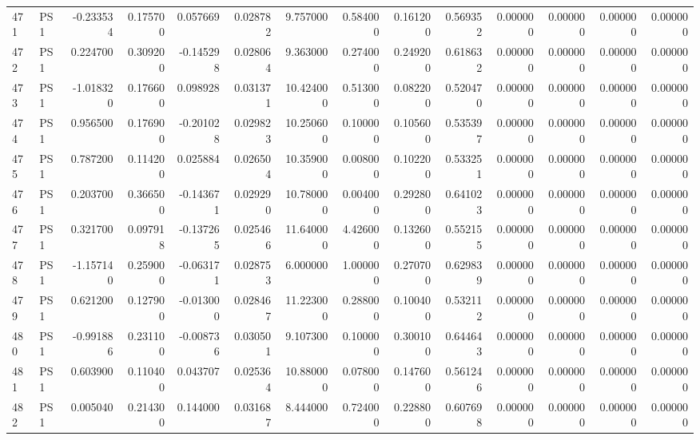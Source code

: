 \begin{tabular}{llrrrrrrrrrrrr}
471 &    PS1 & -0.233534 &      0.175700 &  0.057669 &    0.028782 &   9.757000 &      0.584000 &   0.161200 &  0.569352 &  0.000000 &   0.000000 &     0.000000 &     0.000000 \\
472 &    PS1 &  0.224700 &      0.309200 & -0.145298 &    0.028064 &   9.363000 &      0.274000 &   0.249200 &  0.618632 &  0.000000 &   0.000000 &     0.000000 &     0.000000 \\
473 &    PS1 & -1.018320 &      0.176600 &  0.098928 &    0.031371 &  10.424000 &      0.513000 &   0.082200 &  0.520470 &  0.000000 &   0.000000 &     0.000000 &     0.000000 \\
474 &    PS1 &  0.956500 &      0.176900 & -0.201028 &    0.029823 &  10.250600 &      0.100000 &   0.105600 &  0.535397 &  0.000000 &   0.000000 &     0.000000 &     0.000000 \\
475 &    PS1 &  0.787200 &      0.114200 &  0.025884 &    0.026504 &  10.359000 &      0.008000 &   0.102200 &  0.533251 &  0.000000 &   0.000000 &     0.000000 &     0.000000 \\
476 &    PS1 &  0.203700 &      0.366500 & -0.143671 &    0.029290 &  10.780000 &      0.004000 &   0.292800 &  0.641023 &  0.000000 &   0.000000 &     0.000000 &     0.000000 \\
477 &    PS1 &  0.321700 &      0.097918 & -0.137265 &    0.025466 &  11.640000 &      4.426000 &   0.132600 &  0.552155 &  0.000000 &   0.000000 &     0.000000 &     0.000000 \\
478 &    PS1 & -1.157140 &      0.259000 & -0.063171 &    0.028753 &   6.000000 &      1.000000 &   0.270700 &  0.629839 &  0.000000 &   0.000000 &     0.000000 &     0.000000 \\
479 &    PS1 &  0.621200 &      0.127900 & -0.013000 &    0.028467 &  11.223000 &      0.288000 &   0.100400 &  0.532112 &  0.000000 &   0.000000 &     0.000000 &     0.000000 \\
480 &    PS1 & -0.991886 &      0.231100 & -0.008736 &    0.030501 &   9.107300 &      0.100000 &   0.300100 &  0.644643 &  0.000000 &   0.000000 &     0.000000 &     0.000000 \\
481 &    PS1 &  0.603900 &      0.110400 &  0.043707 &    0.025364 &  10.880000 &      0.078000 &   0.147600 &  0.561246 &  0.000000 &   0.000000 &     0.000000 &     0.000000 \\
482 &    PS1 &  0.005040 &      0.214300 &  0.144000 &    0.031687 &   8.444000 &      0.724000 &   0.228800 &  0.607698 &  0.000000 &   0.000000 &     0.000000 &     0.000000 \\

\end{tabular}
